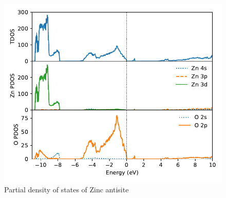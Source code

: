 \begin{figure}[tbh!]
	\centering
	\includegraphics[width=0.6\linewidth]{"images/rnd/dos-pdos_Zn_anti"}
	\caption[Partial density of states of Zinc antisite]{Partial density of states of Zinc antisite}
	\label{fig:dos.Zn-anti}
\end{figure}


